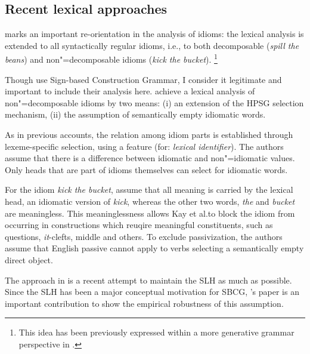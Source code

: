 \documentclass[output=paper]{langsci/langscibook}
\begin{document}
\subsection{Recent lexical approaches}
\label{Sec-RecentLexical}

\cite{KSF2015a} marks an important re-orientation in the analysis of idioms: the lexical analysis is extended to all syntactically regular idioms, i.e., to both decomposable (\emph{spill the beans}) and non"=decomposable idioms (\emph{kick the bucket}).%
\footnote{This idea has been previously expressed within a more generative grammar perspective in \cite{Everaert:10}. 
}

Though \cite{KSF2015a} use Sign-based Construction Grammar, I consider it legitimate and important to include their analysis here.
%
\cite{KSF2015a} achieve a lexical analysis of non"=decomposable idioms by two means: (i) an extension of the HPSG selection mechanism, (ii) the assumption of semantically empty idiomatic words. 

As in previous accounts, the relation among idiom parts is established through lexeme-specific selection, using a feature  (for: \emph{lexical identifier}). 
The authors assume that there is a difference between idiomatic and non"=idiomatic  values. 
Only heads that are part of idioms themselves can select for idiomatic words. 

For the idiom \emph{kick the bucket}, \cite{KSF2015a} assume that all meaning is carried by the lexical head, an idiomatic version of \emph{kick}, whereas the other two words, \emph{the} and \emph{bucket} are meaningless. 
This meaninglessness allows Kay et al.\@ to block the idiom from occurring in constructions which reuqire meaningful constituents, such as questions, \emph{it}-clefts, middle and others. 
To exclude passivization, the authors assume that English passive cannot apply to verbs selecting a semantically empty direct object.

The approach in \cite{KSF2015a} is a recent attempt to maintain the SLH as much as possible. 
Since the SLH has been a major conceptual motivation for SBCG, \citeauthor{KSF2015a}'s paper is an important contribution to show the empirical robustness of this assumption.
\end{document}
